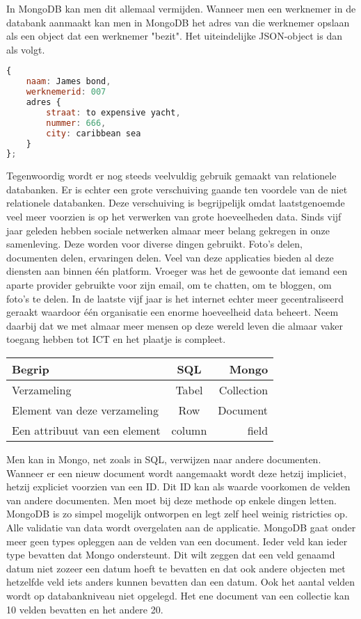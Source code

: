 \documentclass[a4paper,11pt]{article}
\newcommand{\head}[1]{\textnormal{\textbf{#1}}}
\begin{document}
In MongoDB kan men dit allemaal vermijden. Wanneer men een werknemer in de databank aanmaakt kan men in MongoDB het adres van die werknemer opslaan als een object dat een werknemer "bezit". Het uiteindelijke JSON-object is dan als volgt.

\begin{lstlisting}[language=javascript]
{
	naam: James bond,
	werknemerid: 007
	adres {
		straat: to expensive yacht,
		nummer: 666,
		city: caribbean sea
	}
};
\end{lstlisting}

Tegenwoordig wordt er nog steeds veelvuldig gebruik gemaakt van relationele databanken. Er is echter een grote verschuiving gaande ten voordele van de niet relationele databanken. Deze verschuiving is begrijpelijk omdat laatstgenoemde veel meer voorzien is op het verwerken van grote hoeveelheden data. Sinds vijf jaar geleden hebben sociale netwerken almaar meer belang gekregen in onze samenleving. Deze worden voor diverse dingen gebruikt. Foto's delen, documenten delen, ervaringen delen. Veel van deze applicaties bieden al deze diensten aan binnen één platform. Vroeger was het de gewoonte dat iemand een aparte provider gebruikte voor zijn email, om te chatten, om te bloggen, om foto's te delen. In de laatste vijf jaar is het internet echter meer gecentraliseerd geraakt waardoor één organisatie een enorme hoeveelheid data beheert. Neem daarbij dat we met almaar meer mensen op deze wereld leven die almaar vaker toegang hebben tot ICT en het plaatje is compleet.

\begin{tabular}{lcr}
\hline
\head{Begrip} & \head{SQL} & \head{Mongo} \\
\hline
Verzameling & Tabel & Collection \\
Element van deze verzameling & Row & Document \\
Een attribuut van een element & column & field

\end{tabular}

Men kan in Mongo, net zoals in SQL, verwijzen naar andere documenten. Wanneer er een nieuw document wordt aangemaakt wordt deze hetzij impliciet, hetzij expliciet voorzien van een ID. Dit ID kan als waarde voorkomen de velden van andere documenten. Men moet bij deze methode op enkele dingen letten. MongoDB is zo simpel mogelijk ontworpen en legt zelf heel weinig ristricties op. Alle validatie van data wordt overgelaten aan de applicatie. MongoDB gaat onder meer geen types opleggen aan de velden van een document. Ieder veld kan ieder type bevatten dat Mongo ondersteunt. Dit wilt zeggen dat een veld genaamd datum niet zozeer een datum hoeft te bevatten en dat ook andere objecten met hetzelfde veld iets anders kunnen bevatten dan een datum. Ook het aantal velden wordt op databankniveau niet opgelegd. Het ene document van een collectie kan 10 velden bevatten en het andere 20.
\end{document}
